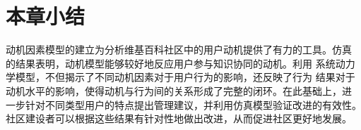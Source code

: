 \section{本章小结}

动机因素模型的建立为分析维基百科社区中的用户动机提供了有力的工具。仿真
的结果表明，动机模型能够较好地反应用户参与知识协同的动机。利用
系统动力学模型，不但揭示了不同动机因素对于用户行为的影响，还反映了行为
结果对于动机水平的影响，使得动机与行为间的关系形成了完整的闭环。在此基础上，进
一步针对不同类型用户的特点提出管理建议，并利用仿真模型验证改进的有效性。
社区建设者可以根据这些结果有针对性地做出改进，从而促进社区更好地发展。




